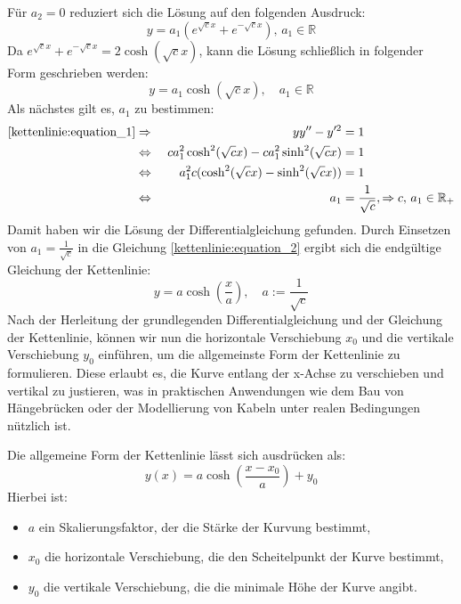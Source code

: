 Für \(a_2 = 0\) reduziert sich die Lösung auf den folgenden Ausdruck:
\[
	y
	=
	a_1\left(e^{\sqrt{c}x} + e^{-\sqrt{c}x}\right), \, a_1 \in \mathbb{R}
\]
Da \(e^{\sqrt{c}x} + e^{-\sqrt{c}x} = 2\cosh(\sqrt{c}x)\), kann die Lösung schließlich in folgender Form geschrieben werden:
\begin{equation}
	y
	=
	a_1\cosh(\sqrt{c}x), \quad a_1 \in \mathbb{R}
	\label{kettenlinie:equation_2}
\end{equation}
Als nächstes gilt es, \(a_1\) zu bestimmen:
\begin{align*}
	\eqref{kettenlinie:equation_1}
	&\Rightarrow &\
	yy'' - y'^2
	&=
	1
	\\
	&\Leftrightarrow &\
	ca_1^2\cosh^2(\sqrt{c}x) - ca_1^2\sinh^2(\sqrt{c}x)
	&=
	1
	\\
	&\Leftrightarrow &\
	a_1^2c(\cosh^2(\sqrt{c}x) - \sinh^2(\sqrt{c}x))
	&=
	1
	\\
	&\Leftrightarrow &\
	a_1
	&=
	\frac{1}{\sqrt{c}}, \Rightarrow c, \, a_1 \in \mathbb{R}_+
\end{align*}
Damit haben wir die Lösung der Differentialgleichung gefunden. Durch Einsetzen von \(a_1 = \frac{1}{\sqrt{c}}\) in die Gleichung \eqref{kettenlinie:equation_2} ergibt sich die endgültige Gleichung der Kettenlinie:
\[
y = a \cosh\left(\frac{x}{a}\right), \quad a := \frac{1}{\sqrt{c}}
\]
Nach der Herleitung der grundlegenden Differentialgleichung und der Gleichung der Kettenlinie, können wir nun die horizontale Verschiebung \(x_0\) und die vertikale Verschiebung \(y_0\) einführen, um die allgemeinste Form der Kettenlinie zu formulieren.
Diese erlaubt es, die Kurve entlang der x-Achse zu verschieben und vertikal zu justieren, was in praktischen Anwendungen wie dem Bau von Hängebrücken oder der Modellierung von Kabeln unter realen Bedingungen nützlich ist.

Die allgemeine Form der Kettenlinie lässt sich ausdrücken als:
\[
	y(x)
	=
	a \cosh\left(\frac{x - x_0}{a}\right) + y_0
\]
Hierbei ist:

\begin{itemize}
	\item \(a\) ein Skalierungsfaktor, der die Stärke der Kurvung bestimmt,
	\item \(x_0\) die horizontale Verschiebung, die den Scheitelpunkt der Kurve bestimmt,
	\item \(y_0\) die vertikale Verschiebung, die die minimale Höhe der Kurve angibt.
\end{itemize}
